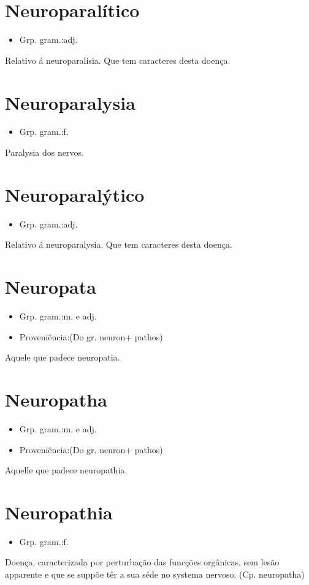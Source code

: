 \section{Neuroparalítico}
\begin{itemize}
\item {Grp. gram.:adj.}
\end{itemize}
Relativo á neuroparalisia.
Que tem caracteres desta doença.
\section{Neuroparalysia}
\begin{itemize}
\item {Grp. gram.:f.}
\end{itemize}
Paralysia dos nervos.
\section{Neuroparalýtico}
\begin{itemize}
\item {Grp. gram.:adj.}
\end{itemize}
Relativo á neuroparalysia.
Que tem caracteres desta doença.
\section{Neuropata}
\begin{itemize}
\item {Grp. gram.:m.  e  adj.}
\end{itemize}
\begin{itemize}
\item {Proveniência:(Do gr. \textunderscore neuron\textunderscore  + \textunderscore pathos\textunderscore )}
\end{itemize}
Aquele que padece neuropatia.
\section{Neuropatha}
\begin{itemize}
\item {Grp. gram.:m.  e  adj.}
\end{itemize}
\begin{itemize}
\item {Proveniência:(Do gr. \textunderscore neuron\textunderscore  + \textunderscore pathos\textunderscore )}
\end{itemize}
Aquelle que padece neuropathia.
\section{Neuropathia}
\begin{itemize}
\item {Grp. gram.:f.}
\end{itemize}
Doença, caracterizada por perturbação das funcções orgânicas, sem lesão apparente e que se suppõe têr a sua séde no systema nervoso.
(Cp. \textunderscore neuropatha\textunderscore )
